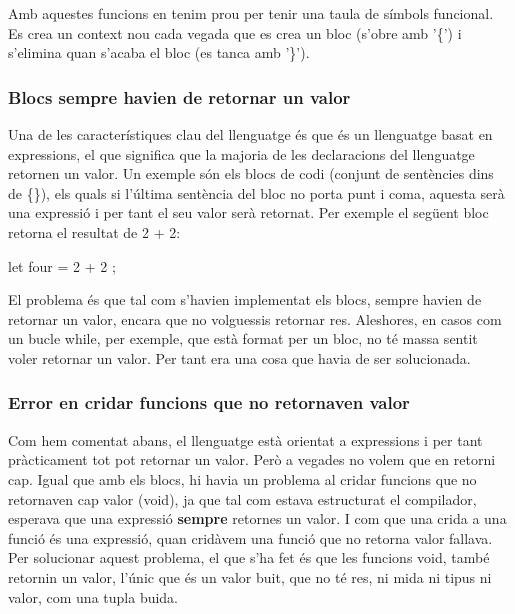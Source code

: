 ﻿\documentclass{article}
\begin{document}
Amb aquestes funcions en tenim prou per tenir una taula de símbols funcional. Es
crea un context nou cada vegada que es crea un bloc (s'obre amb '\{') i
s'elimina quan s'acaba el bloc (es tanca amb '\}').

\subsubsection{Blocs sempre havien de retornar un valor}

Una de les característiques clau del llenguatge és que és un llenguatge basat en
expressions, el que significa que la majoria de les declaracions del llenguatge
retornen un valor. Un exemple són els blocs de codi (conjunt de sentències dins
de \{\}), els quals si l'última sentència del bloc no porta punt i coma, aquesta
serà una expressió i per tant el seu valor serà retornat. Per exemple el següent
bloc retorna el resultat de 2 + 2:

\begin{code}
    let four = {
        2 + 2
    };
\end{code}

El problema és que tal com s'havien implementat els blocs, sempre havien de
retornar un valor, encara que no volguessis retornar res. Aleshores, en casos
com un bucle while, per exemple, que està format per un bloc, no té massa sentit
voler retornar un valor. Per tant era una cosa que havia de ser solucionada.

\subsubsection{Error en cridar funcions que no retornaven valor}

Com hem comentat abans, el llenguatge està orientat a expressions i per tant
pràcticament tot pot retornar un valor. Però a vegades no volem que en retorni
cap. Igual que amb els blocs, hi havia un problema al cridar funcions que no
retornaven cap valor (void), ja que tal com estava estructurat el compilador,
esperava que una expressió \textbf{sempre} retornes un valor. I com que una
crida a una funció és una expressió, quan cridàvem una funció que no retorna
valor fallava. Per solucionar aquest problema, el que s'ha fet és que les
funcions void, també retornin un valor, l'únic que és un valor buit, que no té
res, ni mida ni tipus ni valor, com una tupla buida.
\end{document}
